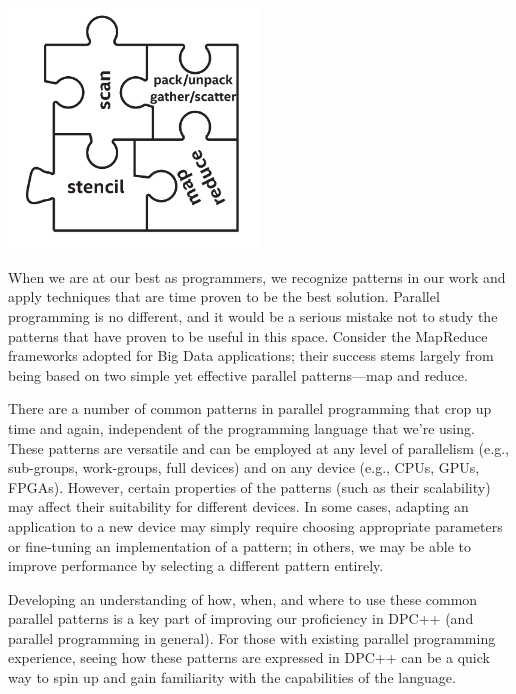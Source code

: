 \begin{center}
	\includegraphics[width=0.5\textwidth]{content/chapter-14/images/1}
\end{center}

When we are at our best as programmers, we recognize patterns in our work and apply techniques that are time proven to be the best solution. Parallel programming is no different, and it would be a serious mistake not to study the patterns that have proven to be useful in this space. Consider the MapReduce frameworks adopted for Big Data applications; their success stems largely from being based on two simple yet effective parallel patterns—map and reduce.\par

There are a number of common patterns in parallel programming that crop up time and again, independent of the programming language that we’re using. These patterns are versatile and can be employed at any level of parallelism (e.g., sub-groups, work-groups, full devices) and on any device (e.g., CPUs, GPUs, FPGAs). However, certain properties of the patterns (such as their scalability) may affect their suitability for different devices. In some cases, adapting an application to a new device may simply require choosing appropriate parameters or fine-tuning an implementation of a pattern; in others, we may be able to improve performance by selecting a different pattern entirely.\par

Developing an understanding of how, when, and where to use these common parallel patterns is a key part of improving our proficiency in DPC++ (and parallel programming in general). For those with existing parallel programming experience, seeing how these patterns are expressed in DPC++ can be a quick way to spin up and gain familiarity with the capabilities of the language.\par

